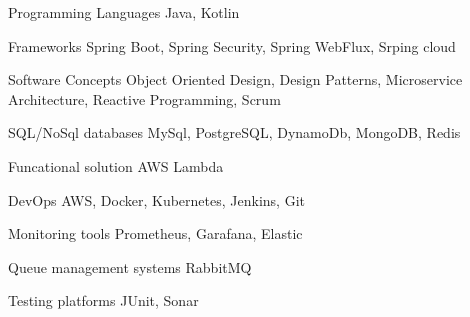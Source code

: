 
\begin{cvskills}

  \cvskill
    {Programming Languages} %
    {Java, Kotlin} %

  \cvskill
    {Frameworks} %
    {Spring Boot, Spring Security, Spring WebFlux, Srping cloud} %

  \cvskill
    {Software Concepts} %
    {Object Oriented Design, Design Patterns, Microservice Architecture, Reactive Programming, Scrum} %

  \cvskill
    {SQL/NoSql databases} %
    {MySql, PostgreSQL, DynamoDb, MongoDB, Redis} %

  \cvskill
    {Funcational solution} %
    {AWS Lambda} %

  \cvskill
    {DevOps} %
    {AWS, Docker, Kubernetes, Jenkins, Git} %

  \cvskill
    {Monitoring tools} %
    {Prometheus, Garafana, Elastic} %

  \cvskill
    {Queue management systems} %
    {RabbitMQ} %

  \cvskill
    {Testing platforms} %
    {JUnit, Sonar} %

\end{cvskills}